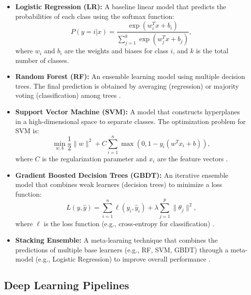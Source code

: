 \documentclass[10pt,twocolumn,letterpaper]{article}
\begin{document}
\begin{itemize}
    \item \textbf{Logistic Regression (LR):} A baseline linear model that predicts the probabilities of each class using the softmax function:
    \begin{equation}
        P(y=i|x) = \frac{\exp(w_i^T x + b_i)}{\sum_{j=1}^k \exp(w_j^T x + b_j)},
    \end{equation}
    where \(w_i\) and \(b_i\) are the weights and biases for class \(i\), and \(k\) is the total number of classes.

    \item \textbf{Random Forest (RF):} An ensemble learning model using multiple decision trees. The final prediction is obtained by averaging (regression) or majority voting (classification) among trees \cite{breiman2001random}.

    \item \textbf{Support Vector Machine (SVM):} A model that constructs hyperplanes in a high-dimensional space to separate classes. The optimization problem for SVM is:
    \begin{equation}
        \min_{w, b} \frac{1}{2} \|w\|^2 + C \sum_{i=1}^n \max(0, 1 - y_i(w^T x_i + b)),
    \end{equation}
    where \(C\) is the regularization parameter and \(x_i\) are the feature vectors \cite{cortes1995support}.

    \item \textbf{Gradient Boosted Decision Trees (GBDT):} An iterative ensemble model that combines weak learners (decision trees) to minimize a loss function:
    \begin{equation}
        L(y, \hat{y}) = \sum_{i=1}^n \ell(y_i, \hat{y}_i) + \lambda \sum_{j=1}^p \|\theta_j\|^2,
    \end{equation}
    where \(\ell\) is the loss function (e.g., cross-entropy for classification) \cite{friedman2001greedy}.

    \item \textbf{Stacking Ensemble:} A meta-learning technique that combines the predictions of multiple base learners (e.g., RF, SVM, GBDT) through a meta-model (e.g., Logistic Regression) to improve overall performance \cite{wolpert1992stacked}.

\end{itemize}

\subsection{Deep Learning Pipelines}
\end{document}
